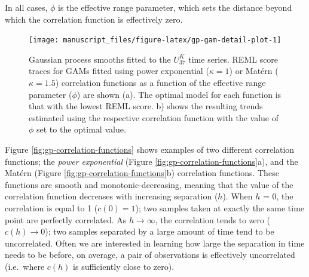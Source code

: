 \documentclass[12pt,]{article}
\newcommand{\uk}{\ensuremath{\mathit{U}^{\mathit{K}}_{\mathup{37}}}}
\begin{document}
In all cases, \(\phi\) is the effective range parameter, which sets the
distance beyond which the correlation function is effectively zero.

\begin{figure}

{\centering \texttt{[image: manuscript\_files/figure-latex/gp-gam-detail-plot-1]} 

}

\caption{Gaussian process smooths fitted to the \uk{} time series. REML score traces for GAMs fitted using power exponential ($\kappa = 1$) or Matérn ($\kappa = 1.5$) correlation functions as a function of the effective range parameter ($\phi$) are shown (a). The optimal model for each function is that with the lowest REML score. b) shows the resulting trends estimated using the respective correlation function with the value of $\phi$ set to the optimal value.}\label{fig:gp-gam-detail-plot}
\end{figure}

Figure \ref{fig:gp-correlation-functions} shows examples of two
different correlation functions; the \emph{power exponential} (Figure
\ref{fig:gp-correlation-functions}a), and the Matérn (Figure
\ref{fig:gp-correlation-functions}b) correlation functions. These
functions are smooth and monotonic-decreasing, meaning that the value of
the correlation function decreases with increasing separation (\(h\)).
When \(h\) = 0, the correlation is equal to 1 (\(c(0) = 1\)); two
samples taken at exactly the same time point are perfectly correlated.
As \(h \rightarrow \infty\), the correlation tends to zero
(\(c(h) \rightarrow 0\)); two samples separated by a large amount of
time tend to be uncorrelated. Often we are interested in learning how
large the separation in time needs to be before, on average, a pair of
observations is effectively uncorrelated (i.e.~where \(c(h)\) is
sufficiently close to zero).
\end{document}
